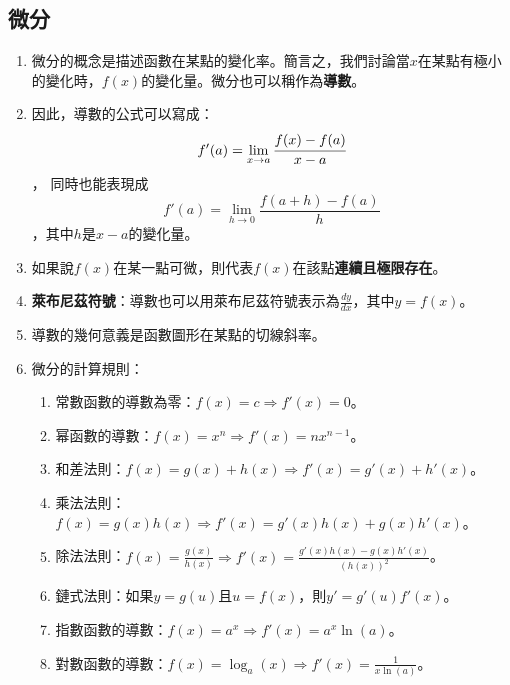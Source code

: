 \documentclass[12pt]{article}
\begin{document}
\begin{tcolorbox}[colframe=black!60!blue, colback=blue!5!white, arc=4pt, boxrule=1pt]
\section{微分}
\begin{enumerate}
    \item 微分的概念是描述函數在某點的變化率。簡言之，我們討論當$x$在某點有極小的變化時，$f(x)$的變化量。微分也可以稱作為\textbf{導數}。
    \item 因此，導數的公式可以寫成：$$f'(a)=\displaystyle\lim_{x\to a}\cfrac{f(x)-f(a)}{x-a}$$，
    同時也能表現成$$f'(a) = \lim_{h \to 0} \frac{f(a+h) - f(a)}{h}$$，其中$h$是$x-a$的變化量。
    \item 如果說$f(x)$在某一點可微，則代表$f(x)$在該點\textbf{連續且極限存在}。
    \item \textbf{萊布尼茲符號}：導數也可以用萊布尼茲符號表示為$\frac{dy}{dx}$，其中$y=f(x)$。
    \item 導數的幾何意義是函數圖形在某點的切線斜率。
    \item 微分的計算規則：
    \begin{enumerate}
        \item 常數函數的導數為零：$f(x) = c \Rightarrow f'(x) = 0$。
        \item 幂函數的導數：$f(x) = x^n \Rightarrow f'(x) = nx^{n-1}$。
        \item 和差法則：$f(x) = g(x) + h(x) \Rightarrow f'(x) = g'(x) + h'(x)$。
        \item 乘法法則：$f(x) = g(x)h(x) \Rightarrow f'(x) = g'(x)h(x) + g(x)h'(x)$。
        \item 除法法則：$f(x) = \frac{g(x)}{h(x)} \Rightarrow f'(x) = \frac{g'(x)h(x) - g(x)h'(x)}{(h(x))^2}$。
        \item 鏈式法則：如果$y = g(u)$且$u = f(x)$，則$y' = g'(u)f'(x)$。
        \item 指數函數的導數：$f(x) = a^x \Rightarrow f'(x) = a^x \ln(a)$。
        \item 對數函數的導數：$f(x) = \log_a(x) \Rightarrow f'(x) = \frac{1}{x \ln(a)}$。
    \end{enumerate}
\end{enumerate}

\end{tcolorbox}
\end{document}
